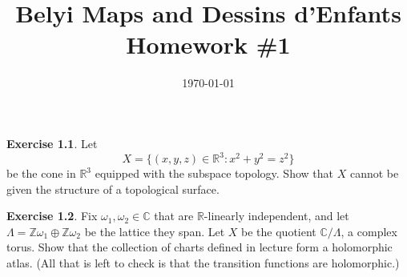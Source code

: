 \documentclass[12pt]{amsart}
\newenvironment{exolab}[1]
{\noindent\textbf{Exercise #1}.}
{\vskip 6pt}
\theoremstyle{remark}
\newcommand{\C}{\mathbb C}
\newcommand{\R}{\mathbb R}
\newcommand{\Z}{\mathbb Z}
\begin{document}
\title[MATH 351 Homework]{Belyi Maps and Dessins d'Enfants \\ Homework \#1}
\date{\today}


\maketitle

\begin{exolab}{1.1}
  Let
  \begin{equation*}
    X = \{(x,y,z) \in \R^3 : x^2 + y^2 = z^2\}
  \end{equation*}
  be the cone in $\R^3$ equipped with the subspace topology. Show that $X$ cannot be given the structure of a topological surface.
\end{exolab}

\begin{exolab}{1.2}
  Fix $\omega_1, \omega_2 \in \C$ that are $\R$-linearly independent, and let $\Lambda = \Z \omega_1 \oplus \Z \omega_2$ be the lattice they span. Let $X$ be the quotient $\C/\Lambda$, a complex torus. Show that the collection of charts defined in lecture form a holomorphic atlas. (All that is left to check is that the transition functions are holomorphic.)
\end{exolab}
\end{document}
